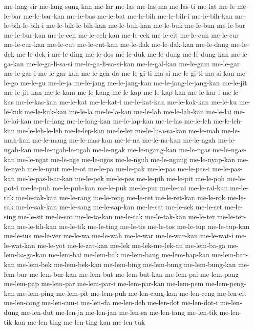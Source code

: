 {me-lang-sir me-lang-sung-kan me-lar me-las me-las-ma me-las-ti me-lat
me-le me-le-bar me-le-bar-kan me-le-bas me-le-bat me-le-bih me-le-bih-i
me-le-bih-kan me-le-bih-le-bih-i me-le-bih-le-bih-kan me-le-buh-kan
me-le-buk me-le-bun me-le-bur me-le-bur-kan me-le-ceh me-le-ceh-kan
me-le-cek me-le-cit me-le-cun me-le-cur me-le-cur-kan me-le-cut
me-le-cut-kan me-le-dak me-le-dak-kan me-le-dang me-le-dek me-le-dek-i
me-le-ding me-le-dos me-le-duk me-le-dung me-le-dung-kan me-le-ga-kan
me-le-ga-li-sa-si me-le-ga-li-sa-si-kan me-le-gal-kan me-le-gam me-le-gar
me-le-gar-i me-le-gar-kan me-le-gen-da me-le-gi-ti-ma-si
me-le-gi-ti-ma-si-kan me-le-go me-le-gu me-le-ja me-le-jang me-le-jang-kan
me-le-jang-le-jang-kan me-le-jit me-le-jit-kan me-le-kam me-le-kang
me-le-kap me-le-kap-kan me-le-kar-i me-le-kas me-le-kas-kan me-le-kat
me-le-kat-i me-le-kat-kan me-le-kok-kan me-le-ku me-le-kuk me-le-kuk-kan
me-le-la me-le-la-kan me-le-lah me-le-lah-kan me-le-lai me-le-lai-kan
me-le-lang me-le-lang-kan me-le-lap-kan me-le-las me-le-leh me-le-leh-kan
me-le-leh-le-leh me-le-lep-kan me-le-ler me-le-lu-a-sa-kan me-le-mah
me-le-mah-kan me-le-mang me-le-mas-kan me-le-na me-le-na-kan me-le-ngah
me-le-ngah-kan me-le-ngah-le-ngah me-le-ngak me-le-ngang-kan me-le-ngas
me-le-ngas-kan me-le-ngat me-le-nge me-le-ngos me-le-nguh me-le-ngung
me-le-nyap-kan me-le-nyeh me-le-nyut me-le-ot me-le-pa me-le-pak me-le-pas
me-le-pas-i me-le-pas-kan me-le-pas-li-ar-kan me-le-pek me-le-pes
me-le-pih me-le-pit me-le-poh me-le-pot-i me-le-puh me-le-puh-kan
me-le-puk me-le-pur me-le-rai me-le-rai-kan me-le-rak me-le-rak-kan
me-le-rang me-le-reng me-le-ret me-le-ret-kan me-le-rok me-le-sak
me-le-sak-kan me-le-sang me-le-sap-kan me-le-sat me-le-sek me-le-set
me-le-sing me-le-sit me-le-sot me-le-ta-kan me-le-tak me-le-tak-kan
me-le-ter me-le-ter-kan me-le-tih-kan me-le-tik me-le-ting me-le-tis
me-le-tos me-le-tup me-le-tup-kan me-le-tus me-le-ver me-le-wa me-le-wah
me-le-war me-le-war-kan me-le-wat-i me-le-wat-kan me-le-yot me-le-zat-kan
me-lek me-lek-me-lek-an me-lem-ba-ga me-lem-ba-ga-kan me-lem-bai
me-lem-bak me-lem-bang me-lem-bap-kan me-lem-bar-kan me-lem-bek
me-lem-bek-kan me-lem-bing me-lem-bung me-lem-bung-kan me-lem-bur
me-lem-bur-kan me-lem-but me-lem-but-kan me-lem-pai me-lem-pang me-lem-pap
me-lem-par me-lem-par-i me-lem-par-kan me-lem-pem me-lem-peng-kan
me-lem-ping me-lem-pit me-lem-puh me-len-cang-kan me-len-ceng me-len-cit
me-len-cong me-len-cun-i me-len-da me-len-deh me-len-dot me-len-dot-i
me-len-dung me-len-dut me-len-ja me-len-jan me-len-sa me-len-tang
me-len-tik me-len-tik-kan me-len-ting me-len-ting-kan me-len-tuk
}
